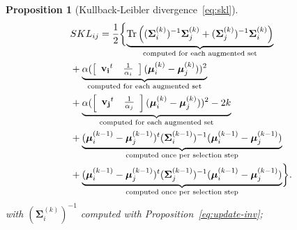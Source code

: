 \documentclass[journal]{IEEEtran}
\newtheorem{prop}{Proposition}
\begin{document}
      \begin{prop}[Kullback-Leibler divergence~\ref{eq:skl}]
        \begin{align}
        \label{eq:skl-update}
            & SKL_{ij} = \frac{1}{2} \biggl\{ \underbrace{\text{\normalfont Tr} \left((\boldsymbol{\Sigma}_i^{(k)})^{-1} \boldsymbol{\Sigma}_j^{(k)} + (\boldsymbol{\Sigma}_j^{(k)})^{-1} \boldsymbol{\Sigma}_i^{(k)}\right)}_{\substack{\text{computed for each augmented set}}} \nonumber \\
            &+ \underbrace{\alpha ( \left[\begin{array}{cc} \mathbf{v_i}^t & \frac{1}{\alpha_i} \end{array}\right] (\boldsymbol{\mu}_i^{(k)} - \boldsymbol{\mu}_j^{(k)}) )^2}_{\substack{\text{computed for each augmented set}}} \nonumber \\
            &+ \underbrace{\alpha ( \left[\begin{array}{cc} \mathbf{v_j}^t & \frac{1}{\alpha_j} \end{array}\right] (\boldsymbol{\mu}_i^{(k)} - \boldsymbol{\mu}_j^{(k)}) )^2 - 2k}_{\substack{\text{computed for each augmented set}}} \nonumber \\
            &+ \underbrace{(\boldsymbol{\mu}_i^{(k-1)} - \boldsymbol{\mu}_j^{(k-1)})^t (\boldsymbol{\Sigma}_i^{(k-1)})^{-1}(\boldsymbol{\mu}_i^{(k-1)} - \boldsymbol{\mu}_j^{(k-1)})}_{\substack{\text{computed once per selection step}}} \nonumber\\
          & + \underbrace{(\boldsymbol{\mu}_i^{(k-1)} - \boldsymbol{\mu}_j^{(k-1)})^t(\boldsymbol{\Sigma}_j^{(k-1)})^{-1} (\boldsymbol{\mu}_i^{(k-1)} - \boldsymbol{\mu}_j^{(k-1)})}_{\substack{\text{computed once per selection step}}} \biggr\}.
        \end{align}
        with $(\boldsymbol{\Sigma}_i^{(k)})^{-1}$ computed with Proposition~\ref{eq:update-inv};
      \end{prop}
\end{document}
